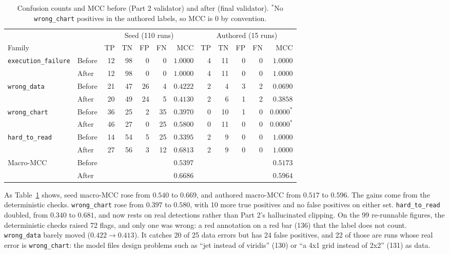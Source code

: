 \documentclass[11pt]{article}
\begin{document}
\begin{table}[h]
\centering
\small
\setlength{\tabcolsep}{4pt}
\begin{tabular}{llrrrrrrrrrr}
\toprule
& & \multicolumn{5}{c}{Seed (110 runs)} & \multicolumn{5}{c}{Authored (15 runs)} \\
\cmidrule(lr){3-7}\cmidrule(lr){8-12}
Family & & TP & TN & FP & FN & MCC & TP & TN & FP & FN & MCC \\
\midrule
\multirow{2}{*}{\texttt{execution\_failure}} & Before & 12 & 98 & 0 & 0 & $1.0000$ & 4 & 11 & 0 & 0 & $1.0000$ \\
 & After & 12 & 98 & 0 & 0 & $1.0000$ & 4 & 11 & 0 & 0 & $1.0000$ \\
\midrule
\multirow{2}{*}{\texttt{wrong\_data}} & Before & 21 & 47 & 26 & 4 & $0.4222$ & 2 & 4 & 3 & 2 & $0.0690$ \\
 & After & 20 & 49 & 24 & 5 & $0.4130$ & 2 & 6 & 1 & 2 & $0.3858$ \\
\midrule
\multirow{2}{*}{\texttt{wrong\_chart}} & Before & 36 & 25 & 2 & 35 & $0.3970$ & 0 & 10 & 1 & 0 & $0.0000^{*}$ \\
 & After & 46 & 27 & 0 & 25 & $0.5800$ & 0 & 11 & 0 & 0 & $0.0000^{*}$ \\
\midrule
\multirow{2}{*}{\texttt{hard\_to\_read}} & Before & 14 & 54 & 5 & 25 & $0.3395$ & 2 & 9 & 0 & 0 & $1.0000$ \\
 & After & 27 & 56 & 3 & 12 & $0.6813$ & 2 & 9 & 0 & 0 & $1.0000$ \\
\midrule
\multirow{2}{*}{Macro-MCC} & Before & \multicolumn{5}{r}{$0.5397$} & \multicolumn{5}{r}{$0.5173$} \\
 & After & \multicolumn{5}{r}{$0.6686$} & \multicolumn{5}{r}{$0.5964$} \\
\bottomrule
\end{tabular}
\caption{Confusion counts and MCC before (Part 2 validator) and after (final
validator). $^{*}$No \texttt{wrong\_chart} positives in the authored labels, so
MCC is 0 by convention.}
\label{tab:part4}
\end{table}

As Table~\ref{tab:part4} shows, seed macro-MCC rose from $0.540$ to $0.669$,
and authored macro-MCC from $0.517$ to $0.596$. The gains come from the
deterministic checks. \texttt{wrong\_chart} rose from $0.397$ to $0.580$, with
10 more true positives and no false positives on either set.
\texttt{hard\_to\_read} doubled, from $0.340$ to $0.681$, and now rests on real
detections rather than Part 2's hallucinated clipping. On the 99 re-runnable
figures, the deterministic checks raised 72 flags, and only one was wrong: a
red annotation on a red bar (136) that the label does not count.
\texttt{wrong\_data} barely moved ($0.422 \to 0.413$). It catches 20 of 25 data
errors but has 24 false positives, and 22 of those are runs whose real error is
\texttt{wrong\_chart}: the model files design problems such as ``jet instead of
viridis'' (130) or ``a 4x1 grid instead of 2x2'' (131) as data.
\end{document}
